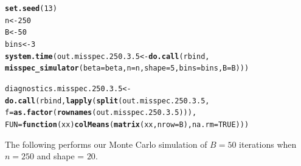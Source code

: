 \documentclass[11pt]{article}\usepackage[]{graphicx}\usepackage[]{color}
\makeatletter
\newcommand{\hlnum}[1]{\textcolor[rgb]{0.686,0.059,0.569}{#1}}%
\newcommand{\hlstd}[1]{\textcolor[rgb]{0.345,0.345,0.345}{#1}}%
\newcommand{\hlkwa}[1]{\textcolor[rgb]{0.161,0.373,0.58}{\textbf{#1}}}%
\newcommand{\hlkwb}[1]{\textcolor[rgb]{0.69,0.353,0.396}{#1}}%
\newcommand{\hlkwc}[1]{\textcolor[rgb]{0.333,0.667,0.333}{#1}}%
\newcommand{\hlkwd}[1]{\textcolor[rgb]{0.737,0.353,0.396}{\textbf{#1}}}%
\newenvironment{kframe}{%
 \def\at@end@of@kframe{}%
 \ifinner\ifhmode%
  \def\at@end@of@kframe{\end{minipage}}%
  \begin{minipage}{\columnwidth}%
 \fi\fi%
 \def\FrameCommand##1{\hskip\@totalleftmargin \hskip-\fboxsep
 \colorbox{shadecolor}{##1}\hskip-\fboxsep
     \hskip-\linewidth \hskip-\@totalleftmargin \hskip\columnwidth}%
 \MakeFramed {\advance\hsize-\width
   \@totalleftmargin\z@ \linewidth\hsize
   \@setminipage}}%
 {\par\unskip\endMakeFramed%
 \at@end@of@kframe}
\newenvironment{knitrout}{}{} %
\makeatother
\begin{document}
\begin{knitrout}
\color{fgcolor}\begin{kframe}
\begin{alltt}
\hlkwd{set.seed}\hlstd{(}\hlnum{13}\hlstd{)}
\hlstd{n} \hlkwb{<-} \hlnum{250}
\hlstd{B} \hlkwb{<-} \hlnum{50}
\hlstd{bins} \hlkwb{<-} \hlnum{3}
\hlkwd{system.time}\hlstd{(out.misspec.250.3.5} \hlkwb{<-} \hlkwd{do.call}\hlstd{(rbind,}
  \hlkwd{misspec_simulator}\hlstd{(}\hlkwc{beta} \hlstd{= beta,} \hlkwc{n} \hlstd{= n,} \hlkwc{shape} \hlstd{=} \hlnum{5}\hlstd{,} \hlkwc{bins} \hlstd{= bins,} \hlkwc{B} \hlstd{= B)))}
\end{alltt}


{\ttfamily\noindent\bfseries\color{errorcolor}{\#\# Error in chol.default(crossprod(x) + lambda[j] * diag(v)): the leading minor of order 5 is not positive definite}}

{\ttfamily\noindent\itshape\color{messagecolor}{\#\# Timing stopped at: 0.199 0 0.2}}\begin{alltt}
\hlstd{diagnostics.misspec.250.3.5} \hlkwb{<-} \hlkwd{do.call}\hlstd{(rbind,} \hlkwd{lapply}\hlstd{(}\hlkwd{split}\hlstd{(out.misspec.250.3.5,}
  \hlkwc{f} \hlstd{=} \hlkwd{as.factor}\hlstd{(}\hlkwd{rownames}\hlstd{(out.misspec.250.3.5))),}
  \hlkwc{FUN} \hlstd{=} \hlkwa{function}\hlstd{(}\hlkwc{xx}\hlstd{)} \hlkwd{colMeans}\hlstd{(}\hlkwd{matrix}\hlstd{(xx,} \hlkwc{nrow} \hlstd{= B),} \hlkwc{na.rm} \hlstd{=} \hlnum{TRUE}\hlstd{)))}
\end{alltt}


{\ttfamily\noindent\bfseries\color{errorcolor}{\#\# Error in split(out.misspec.250.3.5, f = as.factor(rownames(out.misspec.250.3.5))): object 'out.misspec.250.3.5' not found}}\end{kframe}
\end{knitrout}


The following performs our Monte Carlo simulation of $B = 50$ iterations 
when $n = 250$ and shape = $20$.
\end{document}
